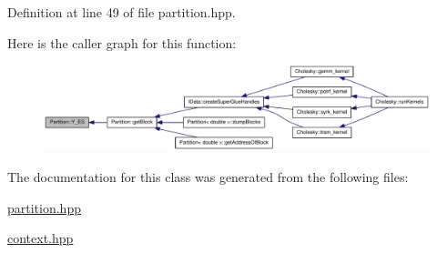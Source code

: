 Definition at line 49 of file partition.hpp.

Here is the caller graph for this function:\nopagebreak
\begin{figure}[H]
\begin{center}
\leavevmode
\includegraphics[width=396pt]{class_partition_a618a4ee9a5432087b30e2e6ef4d951ce_icgraph}
\end{center}
\end{figure}


The documentation for this class was generated from the following files:\begin{DoxyCompactItemize}
\item 
\hyperlink{partition_8hpp}{partition.hpp}\item 
\hyperlink{context_8hpp}{context.hpp}\end{DoxyCompactItemize}
